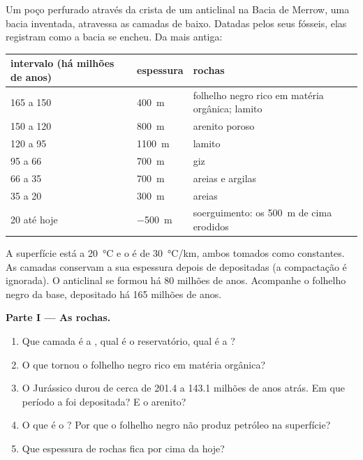 \begin{problem}
\label{pb:g11:fossil-fuel-geology:1}
Um poço perfurado através da crista de um anticlinal na Bacia de Merrow, uma
bacia inventada, atravessa as camadas de baixo. Datadas pelos seus fósseis,
elas registram como a bacia se encheu. Da mais antiga:
\begin{center}
\small
\begin{tabular}{|l|l|l|}
\hline
\textbf{intervalo (há milhões de anos)} & \textbf{espessura} & \textbf{rochas} \\
\hline
165 a 150 & \qty{400}{m} & folhelho negro rico em matéria orgânica; lamito \\
150 a 120 & \qty{800}{m} & arenito poroso \\
120 a 95 & \qty{1100}{m} & lamito \\
95 a 66 & \qty{700}{m} & giz \\
66 a 35 & \qty{700}{m} & areias e argilas \\
35 a 20 & \qty{300}{m} & areias \\
20 até hoje & \qty{-500}{m} & soerguimento: os \qty{500}{m} de cima erodidos \\
\hline
\end{tabular}
\end{center}
A superfície está a \qty{20}{\degreeCelsius} e o  é de
\qty{30}{\degreeCelsius/km}, ambos tomados como constantes. As camadas
conservam a sua espessura depois de depositadas (a compactação é ignorada).
O anticlinal se formou há 80 milhões de anos. Acompanhe o folhelho negro da
base, depositado há 165 milhões de anos.

\medskip
\noindent\textbf{Parte I --- As rochas.}
\begin{enumerate}
  \item Que camada é a , qual é o reservatório, qual é a ?
  \item O que tornou o folhelho negro rico em matéria orgânica?
  \item O Jurássico durou de cerca de \num{201.4} a \num{143.1} milhões de
        anos atrás. Em que período a  foi depositada? E o
        arenito?
  \item O que é o ? Por que o folhelho negro não produz petróleo
        na superfície?
  \item Que espessura de rochas fica por cima da  hoje?
\end{enumerate}


\end{problem}
